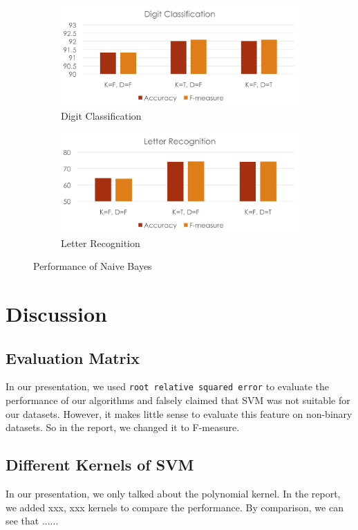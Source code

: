 \documentclass[11pt]{article}
\begin{document}
\begin{figure}[htbp]
\centering

\begin{subfigure}[htbp]{0.46\columnwidth}
\includegraphics*[width=\textwidth]{fig/digit_bayes}
\caption{Digit Classification}
\label{fig:digit-bayes}
\end{subfigure}
\hfill
\begin{subfigure}[htbp]{0.46\columnwidth}
\includegraphics*[width=\textwidth]{fig/letter_bayes}
\caption{Letter Recognition}
\label{fig:letter-bayes}
\end{subfigure}
\caption{Performance of Naive Bayes}
\label{fig:bayes}
\end{figure}
\section{Discussion}

\subsection{Evaluation Matrix}
In our presentation, we used \texttt{root relative squared error} to evaluate the performance of our algorithms and falsely claimed that SVM was not suitable for our datasets. However, it makes little sense to evaluate this feature on  non-binary datasets. So in the report, we changed it to F-measure.

\subsection{Different Kernels of SVM}
In our presentation, we only talked about the polynomial kernel. In the report, we added xxx, xxx kernels to compare the performance. By comparison, we can see that ......
\end{document}
